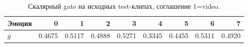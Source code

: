 \begin{table}[H]\centering\footnotesize
\setlength{\tabcolsep}{4pt}
\caption{Скалярный gate на исходных test-клипах, соглашение 1=video.}\label{tab:gate}
\begin{tabular}{lrrrrrrrr}
\toprule
Эмоция & 0 & 1 & 2 & 3 & 4 & 5 & 6 & 7 \\
\midrule
$\bar g$ & 0.4675 & 0.5117 & 0.4888 & 0.5271 & 0.3345 & 0.4455 & 0.5311 & 0.4920 \\
\bottomrule
\end{tabular}
\end{table}
